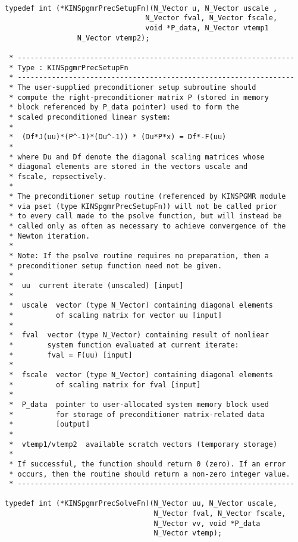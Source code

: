 \documentclass[11pt]{article}
\begin{document}
\small
\begin{verbatim}

typedef int (*KINSpgmrPrecSetupFn)(N_Vector u, N_Vector uscale ,
                                 N_Vector fval, N_Vector fscale,
                                 void *P_data, N_Vector vtemp1
				 N_Vector vtemp2);

 * -----------------------------------------------------------------
 * Type : KINSpgmrPrecSetupFn
 * -----------------------------------------------------------------
 * The user-supplied preconditioner setup subroutine should
 * compute the right-preconditioner matrix P (stored in memory
 * block referenced by P_data pointer) used to form the
 * scaled preconditioned linear system:
 *
 *  (Df*J(uu)*(P^-1)*(Du^-1)) * (Du*P*x) = Df*-F(uu)
 *
 * where Du and Df denote the diagonal scaling matrices whose
 * diagonal elements are stored in the vectors uscale and
 * fscale, repsectively.
 *
 * The preconditioner setup routine (referenced by KINSPGMR module
 * via pset (type KINSpgmrPrecSetupFn)) will not be called prior
 * to every call made to the psolve function, but will instead be
 * called only as often as necessary to achieve convergence of the
 * Newton iteration.
 *
 * Note: If the psolve routine requires no preparation, then a
 * preconditioner setup function need not be given.
 *
 *  uu  current iterate (unscaled) [input]
 *
 *  uscale  vector (type N_Vector) containing diagonal elements
 *          of scaling matrix for vector uu [input]
 *
 *  fval  vector (type N_Vector) containing result of nonliear
 *        system function evaluated at current iterate:
 *        fval = F(uu) [input]
 *
 *  fscale  vector (type N_Vector) containing diagonal elements
 *          of scaling matrix for fval [input]
 *
 *  P_data  pointer to user-allocated system memory block used
 *          for storage of preconditioner matrix-related data
 *          [output]
 *
 *  vtemp1/vtemp2  available scratch vectors (temporary storage)
 *
 * If successful, the function should return 0 (zero). If an error
 * occurs, then the routine should return a non-zero integer value.
 * -----------------------------------------------------------------

typedef int (*KINSpgmrPrecSolveFn)(N_Vector uu, N_Vector uscale, 
                                   N_Vector fval, N_Vector fscale, 
                                   N_Vector vv, void *P_data
                                   N_Vector vtemp);
 

\end{verbatim}
\end{document}
